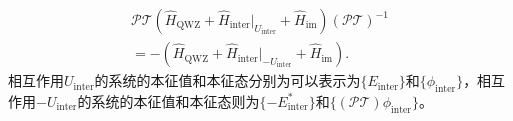 \documentclass[longbibliography, aps, prx, amsmath, amssymb, amsfonts, twocolumn,superscriptaddress, footinbib]{revtex4-1}
\begin{document}
	\begin{equation}
		\begin{split}
			\mathcal{PT} (\hat{H}_{\text{QWZ}}+\hat{H}_{\text{inter}}\vert_{U_{\text{inter}}}+\hat{H}_{\text{im}}) (\mathcal{PT})^{-1}\\
			= -(\hat{H}_{\text{QWZ}}+\hat{H}_{\text{inter}}\vert_{-U_{\text{inter}}}+\hat{H}_{\text{im}}).
		\end{split}
	\end{equation}
	相互作用$U_{\text{inter}}$的系统的本征值和本征态分别为可以表示为$\{E_{\text{inter}}\}$和$\{\phi_{\text{inter}}\}$，相互作用$-U_{\text{inter}}$的系统的本征值和本征态则为$\{-E^*_{\text{inter}}\}$和$\{(\mathcal{PT})\phi_{\text{inter}}\}$。
\end{document}
